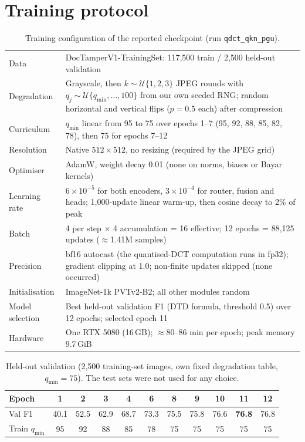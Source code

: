 \documentclass[10pt,a4paper]{article}
\newcommand{\best}[1]{\textbf{#1}}
\begin{document}
\section{Training protocol}
\begin{table}[!htbp]
\centering
\caption{Training configuration of the reported checkpoint (run \texttt{qdct\_qkn\_pgu}).}
\label{tab:train}
\begin{tabularx}{\textwidth}{@{}lX@{}}
\toprule
Data & DocTamperV1-TrainingSet: 117{,}500 train / 2{,}500 held-out validation \\
Degradation & Grayscale, then $k\sim\mathcal{U}\{1,2,3\}$ JPEG rounds with
  $q_j\sim\mathcal{U}\{q_{\min},\dots,100\}$ from our own seeded RNG; random horizontal
  and vertical flips ($p=0.5$ each) after compression \\
Curriculum & $q_{\min}$ linear from 95 to 75 over epochs 1--7
  (95, 92, 88, 85, 82, 78), then 75 for epochs 7--12 \\
Resolution & Native $512\times512$, no resizing (required by the JPEG grid) \\
Optimiser & AdamW, weight decay 0.01 (none on norms, biases or Bayar kernels) \\
Learning rate & $6\times10^{-5}$ for both encoders, $3\times10^{-4}$ for router, fusion and
  heads; 1{,}000-update linear warm-up, then cosine decay to 2\% of peak \\
Batch & 4 per step $\times$ 4 accumulation = 16 effective; 12 epochs = 88{,}125 updates
  ($\approx$1.41M samples) \\
Precision & bf16 autocast (the quantised-DCT computation runs in fp32); gradient clipping
  at 1.0; non-finite updates skipped (none occurred) \\
Initialisation & ImageNet-1k PVTv2-B2; all other modules random \\
Model selection & Best held-out validation F1 (DTD formula, threshold 0.5) over 12 epochs;
  selected epoch 11 \\
Hardware & One RTX 5080 (16\,GB); $\approx$80--86 min per epoch; peak memory 9.7\,GiB \\
\bottomrule
\end{tabularx}
\end{table}

\begin{table}[!htbp]
\centering
\caption{Held-out validation (2{,}500 training-set images, own fixed degradation table,
$q_{\min}=75$). The test sets were not used for any choice.}
\label{tab:val}
\begin{tabular}{@{}lcccccccccc@{}}
\toprule
Epoch & 1 & 2 & 3 & 4 & 6 & 8 & 9 & 10 & \textbf{11} & 12 \\
\midrule
Val F1 & 40.1 & 52.5 & 62.9 & 68.7 & 73.3 & 75.5 & 75.8 & 76.6 & \best{76.8} & 76.8 \\
Train $q_{\min}$ & 95 & 92 & 88 & 85 & 78 & 75 & 75 & 75 & 75 & 75 \\
\bottomrule
\end{tabular}
\end{table}
\end{document}
